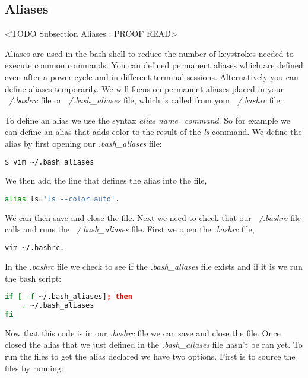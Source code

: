 \subsection{Aliases}
	<TODO Subsection Aliases : PROOF READ>
	
Aliases are used in the bash shell to reduce the number of keystrokes needed to execute common commands. You can defined permanent aliases which are defined even after a power cycle and in different terminal sessions. Alternatively you can define aliases temporarily. We will focus on permanent aliases placed in your \emph{~/.bashrc} file or \emph{~/.bash\_aliases} file, which is called from your \emph{~/.bashrc} file. 

To define an alias we use the syntax \emph{alias name=command}. So for example we can define an alias that adds color to the result of the \emph{ls} command. We define the alias by first opening our \emph{.bash\_aliases} file:

\begin{lstlisting}[language=bash]
	$ vim ~/.bash_aliases
\end{lstlisting}

We then add the line that defines the alias into the file,

\begin{lstlisting}[language=bash]
alias ls='ls --color=auto'.
\end{lstlisting}

We can then save and close the file. Next we need to check that our \emph{~/.bashrc} file calls and runs the \emph{~/.bash\_aliases} file. First we open the \emph{.bashrc} file,

\begin{lstlisting}[language=bash]
vim ~/.bashrc.
\end{lstlisting}

In the \emph{.bashrc} file we check to see if the \emph{.bash\_aliases} file exists and if it is we run the bash script:

\begin{lstlisting}[language=bash]
if [ -f ~/.bash_aliases]; then
	. ~/.bash_aliases
fi
\end{lstlisting}

Now that this code is in our \emph{.bashrc} file we can save and close the file. Once closed the alias that we just defined in the \emph{.bash\_aliases} file hasn't be ran yet. To run the files to get the alias declared we have two options. First is to source the files by running:

